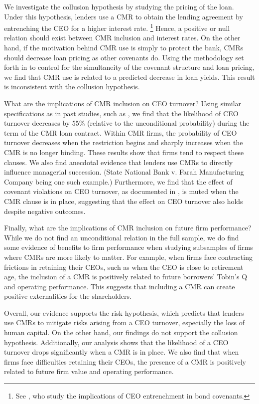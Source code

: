 \documentclass[a4paper,12pt]{article}
\begin{document}
We investigate the collusion hypothesis by studying the pricing of the loan.
Under this hypothesis, lenders use a CMR to obtain the lending agreement by entrenching the CEO for a higher interest rate.%
    \footnote{See \cite{Chava_2010a}, who study the implications of CEO entrenchment in bond covenants.}
Hence, a positive or null relation should exist between CMR inclusion and interest rates.
On the other hand, if the motivation behind CMR use is simply to protect the bank, CMRs should decrease loan pricing as other covenants do.
Using the methodology set forth in \cite{Lee_1978} to control for the simultaneity of the covenant structure and loan pricing, we find that CMR use is related to a predicted decrease in loan yields.
This result is inconsistent with the collusion hypothesis.




What are the implications of CMR inclusion on CEO turnover? 
Using similar specifications as in past studies, such as \cite{Jenter_2015}, we find that the likelihood of CEO turnover decreases by 55\% (relative to the unconditional probability) during the term of the CMR loan contract.
Within CMR firms, the probability of CEO turnover decreases when the restriction begins and sharply increases when the CMR is no longer binding.
These results show that firms tend to respect these clauses.
We also find anecdotal evidence that lenders use CMRs to directly influence managerial succession. 
(State National Bank v. Farah Manufacturing Company being one such example.)
Furthermore, we find that the effect of covenant violations on CEO turnover, as documented in \cite{Nini_2012}, is muted when the CMR clause is in place, suggesting that the effect on CEO turnover also holds despite negative outcomes.




Finally,  what are the implications of CMR inclusion on future firm performance? 
While we do not find an unconditional relation in the full sample, we do find some evidence of benefits to firm performance when studying subsamples of firms where CMRs are more likely to matter.
For example, when firms face contracting frictions in retaining their CEOs, such as when the CEO is close to retirement age, the inclusion of a CMR is positively related to future borrowers' Tobin's Q and operating performance.
This suggests that including a CMR can create positive externalities for the shareholders.



Overall, our evidence supports the risk hypothesis, which predicts that lenders use CMRs to mitigate risks arising from a CEO turnover, especially the loss of human capital.
On the other hand, our findings do not support the collusion hypothesis.
Additionally, our analysis shows that
the likelihood of a CEO turnover drops significantly when a CMR is in place.
We also find that when firms face difficulties retaining their CEOs, the presence of a CMR is positively related to future firm value and operating performance.
\end{document}
